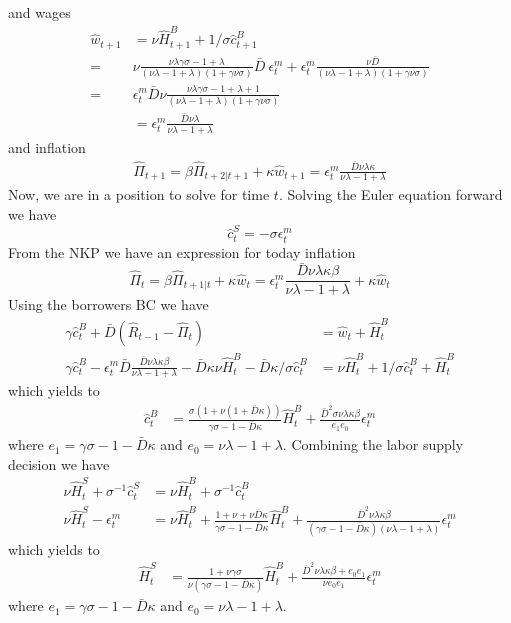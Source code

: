 \documentclass[a4paper,12pt]{article}%
\begin{document}
and wages 
\begin{align*}
{\hat{w}}_{t+1} &= \nu \hat{H}^B_{t+1}+1/\sigma \hat{c}^B_{t+1} \\
=&  \nu \frac{\nu \lambda \gamma \sigma- 1 +\lambda}{ (\nu \lambda -1+\lambda) (1+\gamma\nu\sigma)} \bar{D}\ \epsilon^m_{t} + \epsilon^m_{t} \frac{\nu\bar{D}}{ (\nu \lambda -1+\lambda) (1+\gamma\nu\sigma)} \\
=& \epsilon^m_{t} \bar{D} \nu \frac{\nu \lambda \gamma \sigma- 1 +\lambda + 1}{ (\nu \lambda -1+\lambda) (1+\gamma\nu\sigma)} \\
&=\epsilon^m_{t}  \frac{\bar{D} \nu \lambda}{\nu \lambda -1+\lambda} 
\end{align*}
and inflation 
\begin{align*}
\hat{\Pi}_{t+1} =\beta \hat{\Pi}_{t+2|t+1}+ \kappa  \hat{w}_{t+1} = \epsilon^m_{t}  \frac{\bar{D} \nu \lambda \kappa}{\nu \lambda -1+\lambda}
\end{align*}
Now, we are in a position to solve for time $t$. Solving the Euler equation forward we have  
$$ \hat{c}_{t}^{S} = - \sigma \epsilon^m_{t}$$
From the NKP we have an expression for today inflation
$$ \hat{\Pi}_{t} = \beta  {\hat{\Pi}}_{t+1|t} + \kappa {\hat{w}}_{t}  = \epsilon^m_{t}  \frac{\bar{D} \nu \lambda \kappa \beta}{\nu \lambda -1+\lambda} +  \kappa {\hat{w}}_{t}   $$
Using the borrowers BC we have 
\begin{align*}
\gamma\hat{c}^B_{t}+{\bar{D}}(\hat{R}_{t-1}-\hat{\Pi}_{t}) &= {\hat{w}}_{t}+\hat{H}^B_{t}\\
\gamma\hat{c}^B_{t}- \epsilon^m_{t} {\bar{D}} \frac{\bar{D} \nu \lambda \kappa \beta}{\nu \lambda -1+\lambda} -  {\bar{D}}\kappa \nu \hat{H}^B_{t} - {\bar{D}}\kappa /\sigma \hat{c}^B_{t}   &=    \nu \hat{H}^B_{t} + 1 /\sigma \hat{c}^B_{t}+\hat{H}^B_{t}
\end{align*}
which yields to 
\begin{align*}
 \hat{c}^B_{t}  &=\frac{\sigma(1+\nu(1+{\bar{D}}\kappa))}{\gamma\sigma-1-{\bar{D}}\kappa}\hat{H}^B_{t} + 
 \frac{\bar{D}^2 \sigma\nu \lambda \kappa \beta}{e_1e_0}\epsilon^m_{t}
\end{align*}
where $e_1=\gamma\sigma-1-{\bar{D}}\kappa$ and $e_0 = \nu \lambda -1+\lambda$.
Combining the labor supply decision we have 
\begin{align*}
\nu \hat{H}^S_{t} + \sigma^{-1} \hat{c}^S_{t} &= \nu \hat{H}^B_{t} + \sigma^{-1} \hat{c}^B_{t}\\
\nu \hat{H}^S_{t} - \epsilon^m_{t} &= \nu \hat{H}^B_{t} + \frac{1+\nu+\nu{\bar{D}}\kappa}{\gamma\sigma-1-{\bar{D}}\kappa}\hat{H}^B_{t} + 
 \frac{\bar{D}^2 \nu \lambda \kappa \beta}{(\gamma\sigma-1-{\bar{D}}\kappa)(\nu \lambda -1+\lambda)}\epsilon^m_{t}
\end{align*}
which yields to 
\begin{align*}
\hat{H}^S_{t}  &= \frac{1+\nu\gamma\sigma}{\nu(\gamma\sigma-1-{\bar{D}}\kappa)}\hat{H}^B_{t} + 
 \frac{\bar{D}^2 \nu \lambda \kappa \beta+ e_0e_1}{\nu e_0e_1}\epsilon^m_{t}
\end{align*}
where $e_1=\gamma\sigma-1-{\bar{D}}\kappa$ and $e_0 = \nu \lambda -1+\lambda$.
\end{document}
